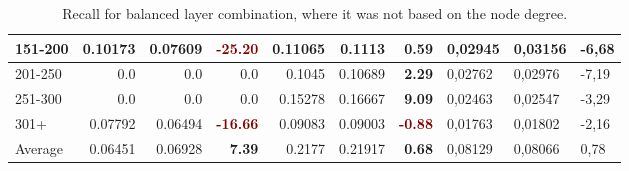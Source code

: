 \begin{table*}[]
\begin{tabular}{|l|r|r|r||r|r|r||l|l|l|}
        151-200   & 0.10173                                 & 0.07609                       & \textbf{\textcolor{Maroon}{-25.20}}    & 0.11065                    & 0.1113                   & \textbf{\textcolor{OliveGreen}{0.59}} & 0,02945 & 0,03156     & -6,68 \\ \hline
        201-250   & 0.0                                     & 0.0                           & 0.0                                    & 0.1045                     & 0.10689                  & \textbf{\textcolor{OliveGreen}{2.29}} & 0,02762 & 0,02976     & -7,19 \\ \hline
        251-300   & 0.0                                     & 0.0                           & 0.0                                    & 0.15278                    & 0.16667                  & \textbf{\textcolor{OliveGreen}{9.09}} & 0,02463 & 0,02547     & -3,29 \\ \hline
        301+      & 0.07792                                 & 0.06494                       & \textbf{\textcolor{Maroon}{-16.66}}    & 0.09083                    & 0.09003                  & \textbf{\textcolor{Maroon}{-0.88}}    & 0,01763 & 0,01802     & -2,16 \\ \hline
        Average   & 0.06451                                 & 0.06928                       & \textbf{\textcolor{OliveGreen}{7.39}}  & 0.2177                     & 0.21917                  & \textbf{\textcolor{OliveGreen}{0.68}} & 0,08129 & 0,08066     & 0,78  \\ \hline
    \end{tabular}
    \caption{Recall for balanced layer combination, where it was not based on the node degree.}
    \label{tab:balanced-layer-combination-recall}
\end{table*}

